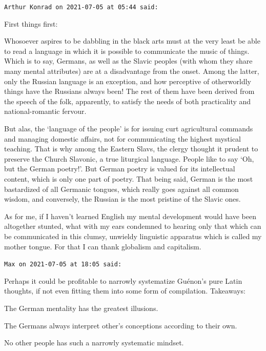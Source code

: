 \begin{footnotesize}\begin{sffamily}



\texttt{Arthur Konrad on 2021-07-05 at 05:44 said: }

First things first:

Whosoever aspires to be dabbling in the black arts must at the very least be able to read a language in which it is possible to communicate the music of things. Which is to say, Germans, as well as the Slavic peoples (with whom they share many mental attributes) are at a disadvantage from the onset. Among the latter, only the Russian language is an exception, and how perceptive of otherworldly things have the Russians always been! The rest of them have been derived from the speech of the folk, apparently, to satisfy the needs of both practicality and national-romantic fervour.

But alas, the `language of the people' is for issuing curt agricultural commands and managing domestic affairs, not for communicating the highest mystical teaching. That is why among the Eastern Slavs, the clergy thought it prudent to preserve the Church Slavonic, a true liturgical language. People like to say `Oh, but the German poetry!'. But German poetry is valued for its intellectual content, which is only one part of poetry. That being said, German is the most bastardized of all Germanic tongues, which really goes against all common wisdom, and conversely, the Russian is the most pristine of the Slavic ones.

As for me, if I haven't learned English my mental development would have been altogether stunted, what with my ears condemned to hearing only that which can be communicated in this clumsy, unwieldy linguistic apparatus which is called my mother tongue. For that I can thank globalism and capitalism.


\hfill

\texttt{Max on 2021-07-05 at 18:05 said: }

Perhaps it could be profitable to narrowly systematize Guénon's pure Latin thoughts, if not even fitting them into some form of compilation. Takeaways:

The German mentality has the greatest illusions.

The Germans always interpret other's conceptions according to their own.

No other people has such a narrowly systematic mindset.


\end{sffamily}
\end{footnotesize}
